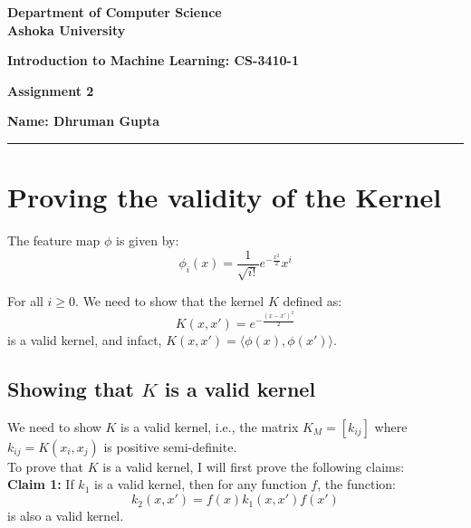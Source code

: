 \documentclass[a4paper]{article}
\begin{document}
\begin{center}
{\large \bf \color{red}  Department of Computer Science} \\
{\large \bf \color{red}  Ashoka University} \\

\vspace{0.1in}

{\large \bf \color{blue} Introduction to Machine Learning: CS-3410-1}

\vspace{0.05in}

    { \bf \color{YellowOrange} Assignment 2}
\end{center}
\medskip

{\textbf{Name: Dhruman Gupta} }

\bigskip
\hrule

\section{Proving the validity of the Kernel}

The feature map $\phi$ is given by:
\begin{equation*}
    \phi_i(x) = \frac{1}{\sqrt{i!}}e^{-\frac{x^2}{2}} x^i
\end{equation*}

For all $i \geq 0$. We need to show that the kernel $K$ defined as:
\begin{equation*}
    K(x, x') = e^{-\frac{(x-x')^2}{2}}
\end{equation*}
is a valid kernel, and infact, $K(x, x') = \langle \phi(x), \phi(x') \rangle$.

\subsection{Showing that $K$ is a valid kernel}

We need to show $K$ is a valid kernel, i.e., the matrix $K_M = [k_{ij}]$ where $k_{ij} = K(x_i, x_j)$ is positive semi-definite.\\

To prove that $K$ is a valid kernel, I will first prove the following claims:\\

\textbf{Claim 1:} If $k_1$ is a valid kernel, then for any function $f$, the function:
\begin{equation*}
    k_2(x, x') = f(x)k_1(x, x')f(x')
\end{equation*}
is also a valid kernel.\\
\end{document}

